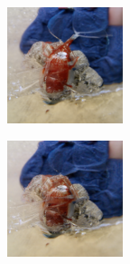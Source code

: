 \documentclass{article}
\begin{document}
\begin{figure}
\begin{subfigure}[b]{0.5\linewidth}
\begin{subfigure}[b]{0.242\linewidth}
        \end{subfigure}%
        \begin{subfigure}[b]{0.242\linewidth}
        \includegraphics[width=\linewidth]{figures/imagenet128/solver_samples/imagenet128_fm_ot_54_20.png}
        \end{subfigure}%
        \begin{subfigure}[b]{0.242\linewidth}
        \includegraphics[width=\linewidth]{figures/imagenet128/solver_samples/imagenet128_fm_ot_54_50.png}

\end{subfigure}
\end{subfigure}
\end{figure}
\end{document}
